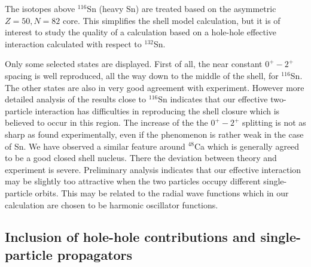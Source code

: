 The isotopes above $^{116}$Sn (heavy Sn) are treated based 
on the asymmetric $Z = 50, N = 82$ core. 
This simplifies the shell model calculation, but it is of interest
to study the quality of a calculation based on
a hole-hole effective 
interaction calculated with respect to $^{132}$Sn.

Only some selected states are displayed. First of all, the 
near constant $0^{+} - 2^{+}$ spacing is well reproduced,
all the way down to the middle of the shell, for 
$^{116}$Sn.
The other states are also in very good agreement
with experiment. However more detailed analysis of 
the results close to $^{116}$Sn
indicates that our effective two-particle interaction 
has difficulties in reproducing
the shell closure which is believed to occur in this region. 
The increase of the 
the $0^{+} - 2^{+}$ splitting is not as sharp as found 
experimentally, even if the 
phenomenon is rather weak in the case of Sn.
We have observed a similar feature around $^{48}$Ca \cite{Morten:hko95}
which is generally agreed
to be a good closed shell nucleus. There the deviation 
between theory and experiment 
is severe. Preliminary analysis indicates that our effective interaction
may be slightly too attractive when the two particles 
occupy different single-particle orbits.
This may be related to the radial wave functions which in our calculation are 
chosen to be harmonic oscillator functions.



\subsection{Inclusion of hole-hole contributions and 
single-particle propagators}

